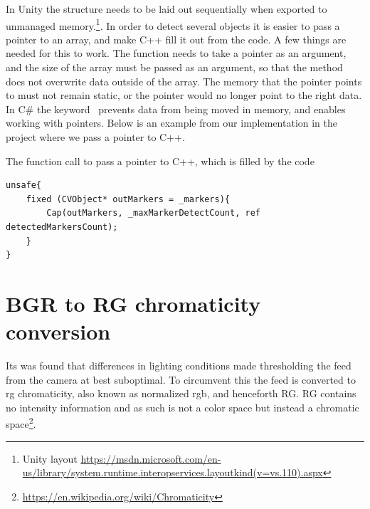 In Unity the structure needs to be laid out sequentially when exported to unmanaged memory.\footnote{Unity layout \url{https://msdn.microsoft.com/en-us/library/system.runtime.interopservices.layoutkind(v=vs.110).aspx}}. In order to detect several objects it is easier to pass a pointer to an array, and make C++ fill it out from the code. A few things are needed for this to work. The function needs to take a pointer as an argument, and the size of the array must be passed as an argument, so that the method does not overwrite data outside of the array. The memory that the pointer points to must not remain static, or the pointer would no longer point to the right data. In C\# the keyword  prevents data from being moved in memory, and  enables working with pointers. Below is an example from our implementation in the project where we pass a pointer to C++. %
\begin{listing}[H]
\caption{The function call to pass a pointer to C++, which is filled by the code}
\label{listing:pointer}
\begin{verbatim}
unsafe{
	fixed (CVObject* outMarkers = _markers){
		Cap(outMarkers, _maxMarkerDetectCount, ref detectedMarkersCount);
	}
}
\end{verbatim}
\end{listing}

\section{BGR to RG chromaticity conversion}
Its was found that differences in lighting conditions made thresholding the feed from the camera at best suboptimal. To circumvent this the feed is converted to rg chromaticity, also known as normalized rgb, and henceforth RG. RG contains no intensity information and as such is not a color space but instead a chromatic space\footnote{\url{https://en.wikipedia.org/wiki/Chromaticity}}.
